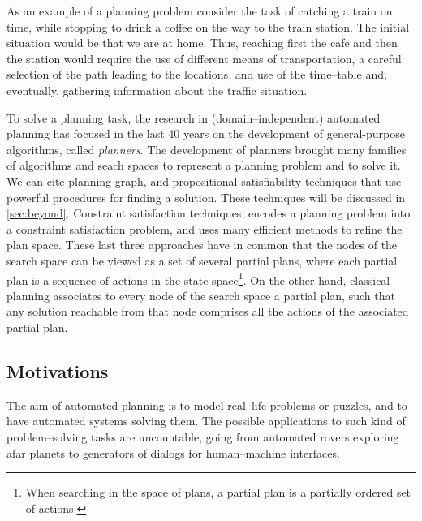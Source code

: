 \begin{example}\label{ex:first}
  As an example of a planning problem consider the task of catching a
  train on time, while stopping to drink a coffee on the way to the
  train station.  The initial situation would be that we are at home.
  Thus, reaching first the cafe and then the station would require the
  use of different means of transportation, a careful selection of the
  path leading to the locations, and use of the time--table and,
  eventually, gathering information about the traffic situation.

\end{example}

To solve a planning task, the research in (domain--independent)
automated planning has focused in the last 40 years on the development
of general-purpose algorithms, called \emph{planners}. 
The development of planners brought many families of algorithms and seach spaces to represent a planning problem and to solve it.
We can cite planning-graph, and propositional satisfiability techniques that use powerful procedures for finding a solution. These techniques will be discussed in \autoref{sec:beyond}. Constraint satisfaction techniques, encodes a planning problem into a constraint satisfaction problem, and uses many efficient methods to refine the plan space. These last three approaches have in common that the nodes of the search space can be viewed as a set of several partial plans,
where each partial plan is a sequence of actions in the state space\footnote{When searching in the space of plans, a partial plan is a partially ordered set of actions.}. 
On the other hand, classical planning associates to every node of the search space a partial plan, such that any solution reachable from that node comprises all the actions of the associated partial plan.


\subsection{Motivations} %
The aim of automated planning is to
model real--life problems or puzzles, and to have automated systems
solving them. 
The possible applications to such kind of problem--solving tasks
are uncountable, 
going from automated rovers exploring afar planets to
generators of dialogs for human--machine interfaces.

